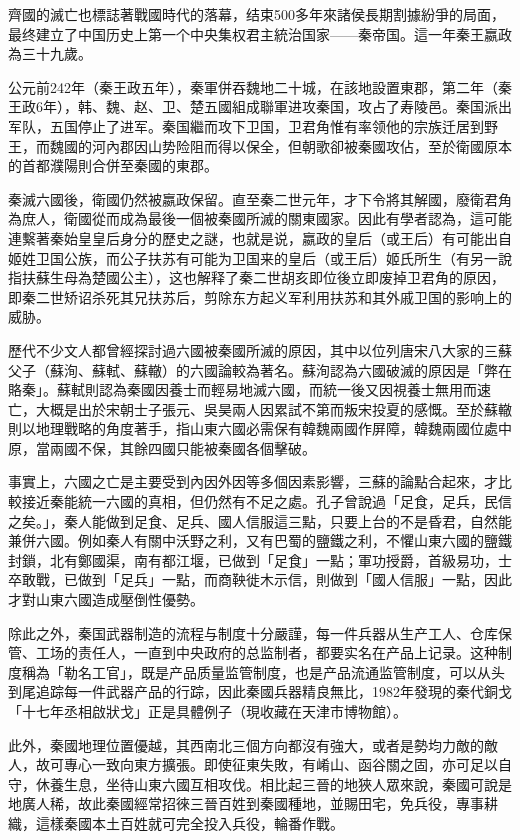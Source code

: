 齊國的滅亡也標誌著戰國時代的落幕，结束500多年來諸侯長期割據紛爭的局面，最终建立了中国历史上第一个中央集权君主統治国家——秦帝国。這一年秦王嬴政為三十九歲。

公元前242年（秦王政五年），秦軍併吞魏地二十城，在該地設置東郡，第二年（秦王政6年），韩、魏、赵、卫、楚五國組成聯軍进攻秦国，攻占了寿陵邑。秦国派出军队，五国停止了进军。秦国繼而攻下卫国，卫君角惟有率领他的宗族迁居到野王，而魏國的河內郡因山势险阻而得以保全，但朝歌卻被秦國攻佔，至於衛國原本的首都濮陽則合併至秦國的東郡。

秦滅六國後，衛國仍然被嬴政保留。直至秦二世元年，才下令將其解國，廢衛君角為庶人，衛國從而成為最後一個被秦國所滅的關東國家。因此有學者認為，這可能連繫著秦始皇皇后身分的歷史之謎，也就是说，嬴政的皇后（或王后）有可能出自姬姓卫国公族，而公子扶苏有可能为卫国来的皇后（或王后）姬氏所生（有另一說指扶蘇生母為楚國公主），这也解释了秦二世胡亥即位後立即废掉卫君角的原因，即秦二世矫诏杀死其兄扶苏后，剪除东方起义军利用扶苏和其外戚卫国的影响上的威胁。

歷代不少文人都曾經探討過六國被秦國所滅的原因，其中以位列唐宋八大家的三蘇父子（蘇洵、蘇軾、蘇轍）的六國論較為著名。蘇洵認為六國破滅的原因是「弊在賂秦」。蘇軾則認為秦國因養士而輕易地滅六國，而統一後又因視養士無用而速亡，大概是出於宋朝士子張元、吳昊兩人因累試不第而叛宋投夏的感慨。至於蘇轍則以地理戰略的角度著手，指山東六國必需保有韓魏兩國作屏障，韓魏兩國位處中原，當兩國不保，其餘四國只能被秦國各個擊破。

事實上，六國之亡是主要受到內因外因等多個因素影響，三蘇的論點合起來，才比較接近秦能統一六國的真相，但仍然有不足之處。孔子曾說過「足食，足兵，民信之矣。」，秦人能做到足食、足兵、國人信服這三點，只要上台的不是昏君，自然能兼併六國。例如秦人有關中沃野之利，又有巴蜀的鹽鐵之利，不懼山東六國的鹽鐵封鎖，北有鄭國渠，南有都江堰，已做到「足食」一點；軍功授爵，首級易功，士卒敢戰，已做到「足兵」一點，而商鞅徙木示信，則做到「國人信服」一點，因此才對山東六國造成壓倒性優勢。

除此之外，秦国武器制造的流程与制度十分嚴謹，每一件兵器从生产工人、仓库保管、工场的责任人，一直到中央政府的总监制者，都要实名在产品上记录。这种制度稱為「勒名工官」，既是产品质量监管制度，也是产品流通监管制度，可以从头到尾追踪每一件武器产品的行踪，因此秦國兵器精良無比，1982年發現的秦代銅戈「十七年丞相啟狀戈」正是具體例子（現收藏在天津市博物館）。

此外，秦國地理位置優越，其西南北三個方向都沒有強大，或者是勢均力敵的敵人，故可專心一致向東方擴張。即使征東失敗，有崤山、函谷關之固，亦可足以自守，休養生息，坐待山東六國互相攻伐。相比起三晉的地狹人眾來說，秦國可說是地廣人稀，故此秦國經常招徠三晉百姓到秦國種地，並賜田宅，免兵役，專事耕織，這樣秦國本土百姓就可完全投入兵役，輪番作戰。

